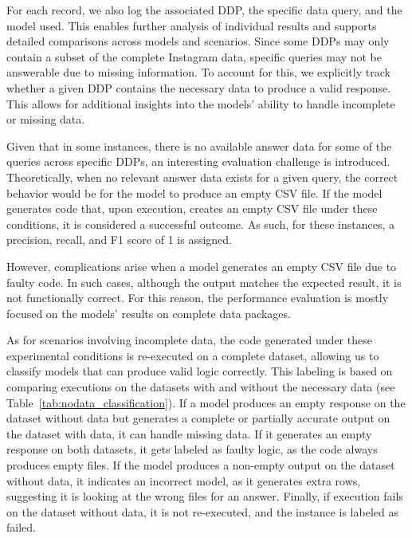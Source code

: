 \documentclass{DESSThesis}
\begin{document}
For each record, we also log the associated DDP, the specific data query, and the model used. This enables further analysis of individual results and supports detailed comparisons across models and scenarios. Since some DDPs may only contain a subset of the complete Instagram data, specific queries may not be answerable due to missing information. To account for this, we explicitly track whether a given DDP contains the necessary data to produce a valid response. This allows for additional insights into the models' ability to handle incomplete or missing data.

Given that in some instances, there is no available answer data for some of the queries across specific DDPs, an interesting evaluation challenge is introduced. Theoretically, when no relevant answer data exists for a given query, the correct behavior would be for the model to produce an empty CSV file. If the model generates code that, upon execution, creates an empty CSV file under these conditions, it is considered a successful outcome. As such, for these instances, a precision, recall, and F1 score of 1 is assigned.

However, complications arise when a model generates an empty CSV file due to faulty code. In such cases, although the output matches the expected result, it is not functionally correct. For this reason, the performance evaluation is mostly focused on the models' results on complete data packages. 

As for scenarios involving incomplete data, the code generated under these experimental conditions is re-executed on a complete dataset, allowing us to classify models that can produce valid logic correctly. This labeling is based on comparing executions on the datasets with and without the necessary data (see Table~\ref{tab:nodata_classification}).  If a model produces an empty response on the dataset without data but generates a complete or partially accurate output on the dataset with data, it can handle missing data. If it generates an empty response on both datasets, it gets labeled as faulty logic, as the code always produces empty files. If the model produces a non-empty output on the dataset without data, it indicates an incorrect model, as it generates extra rows, suggesting it is looking at the wrong files for an answer. Finally, if execution fails on the dataset without data, it is not re-executed, and the instance is labeled as failed.
\end{document}

